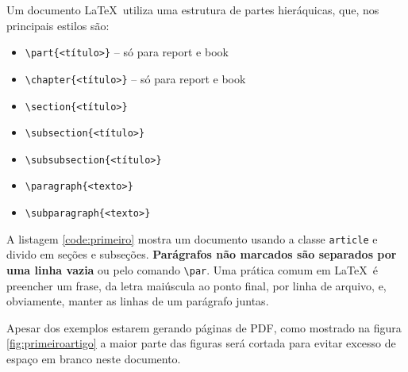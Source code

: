 Um documento \LaTeX\ utiliza uma estrutura de partes hieráquicas, que, nos principais estilos são:
    \begin{itemize}
    \item \lstinline|\part{<título>}| -- só para report e book
    \item \lstinline|\chapter{<título>}| -- só para report e book
    \item \lstinline|\section{<título>}|
    \item \lstinline|\subsection{<título>}|
    \item \lstinline|\subsubsection{<título>}|
    \item \lstinline|\paragraph{<texto>}|
    \item \lstinline|\subparagraph{<texto>}|
\end{itemize}

A listagem \ref{code:primeiro} mostra um documento usando a classe \lstinline|article| e divido em seções e subseções.
\textbf{Parágrafos não marcados são separados por uma linha vazia} ou pelo comando \lstinline|\par|.
Uma prática comum em \LaTeX\ é preencher um frase, da letra maiúscula ao ponto final, por linha de arquivo, e, obviamente, manter as linhas de um parágrafo juntas.

Apesar dos exemplos estarem gerando páginas de PDF,  como mostrado na figura \ref{fig:primeiroartigo} a maior parte
das figuras será cortada para evitar excesso de espaço em branco
neste documento.



